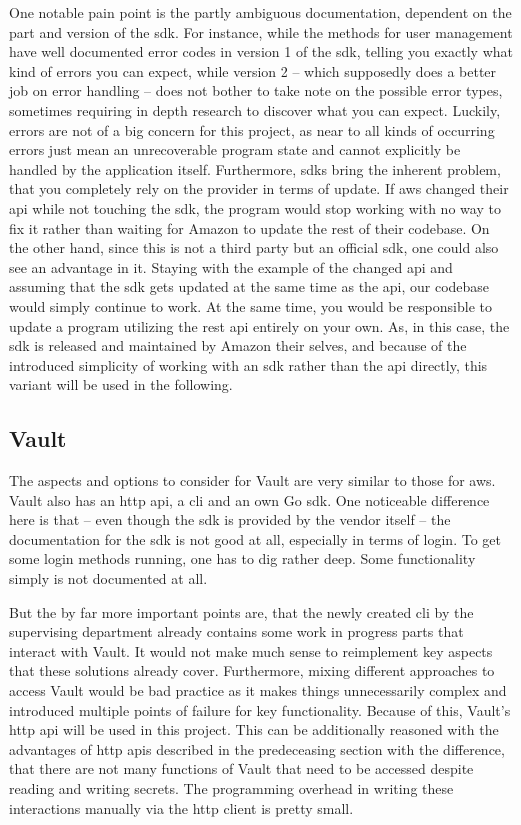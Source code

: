 One notable pain point is the partly ambiguous documentation, dependent on the part and version of the \ac{sdk}.
For instance, while the methods for user management have well documented error codes in version 1 of the \ac{sdk}, telling you exactly what kind of errors you can expect, while version 2 -- which supposedly does a better job on error handling -- does not bother to take note on the possible error types, sometimes requiring in depth research to discover what you can expect.
Luckily, errors are not of a big concern for this project, as near to all kinds of occurring errors just mean an unrecoverable program state and cannot explicitly be handled by the application itself.
Furthermore, \acp{sdk} bring the inherent problem, that you completely rely on the provider in terms of update.
If \ac{aws} changed their \ac{api} while not touching the \ac{sdk}, the program would stop working with no way to fix it rather than waiting for Amazon to update the rest of their codebase.
On the other hand, since this is not a third party but an official \ac{sdk}, one could also see an advantage in it.
Staying with the example of the changed \ac{api} and assuming that the \ac{sdk} gets updated at the same time as the \ac{api}, our codebase would simply continue to work.
At the same time, you would be responsible to update a program utilizing the \acs{rest} \ac{api} entirely on your own.
As, in this case, the \ac{sdk} is released and maintained by Amazon their selves, and because of the introduced simplicity of working with an \ac{sdk} rather than the \ac{api} directly, this variant will be used in the following.

\subsection{Vault}
The aspects and options to consider for Vault are very similar to those for \ac{aws}.
Vault also has an \ac{http} \ac{api}, a \ac{cli} and an own Go \ac{sdk}.
One noticeable difference here is that -- even though the \ac{sdk} is provided by the vendor itself -- the documentation for the \ac{sdk} is not good at all, especially in terms of login.
To get some login methods running, one has to dig rather deep.
Some functionality simply is not documented at all.

But the by far more important points are, that the newly created \ac{cli} by the supervising department already contains some work in progress parts that interact with Vault.
It would not make much sense to reimplement key aspects that these solutions already cover.
Furthermore, mixing different approaches to access Vault would be bad practice as it makes things unnecessarily complex and introduced multiple points of failure for key functionality.
Because of this, Vault's \ac{http} \ac{api} will be used in this project.
This can be additionally reasoned with the advantages of \ac{http} \acp{api} described in the predeceasing section with the difference, that there are not many functions of Vault that need to be accessed despite reading and writing secrets.
The programming overhead in writing these interactions manually via the \ac{http} client is pretty small.

